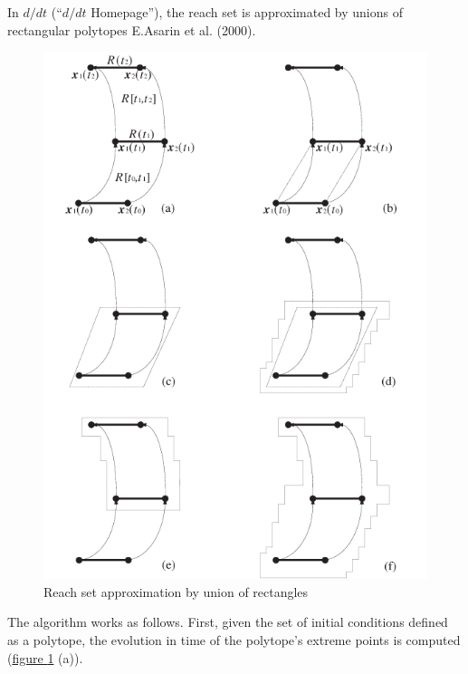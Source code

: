 \documentclass[letterpaper,10pt,english]{sphinxmanual}
\begin{document}
In $d/dt$ (“$d/dt$ Homepage”), the reach set is approximated by
unions of rectangular polytopes E.Asarin et al. (2000).
\begin{figure}[htbp]
\centering
\capstart

\includegraphics{ddt.png}
\caption{Reach set approximation by union of rectangles}\label{chap_intro:ddtfig}\end{figure}

The algorithm works as follows. First, given the set of initial
conditions defined as a polytope, the evolution in time of the
polytope’s extreme points is computed (\hyperref[chap_intro:ddtfig]{figure  \ref*{chap_intro:ddtfig}} (a)).
\end{document}
